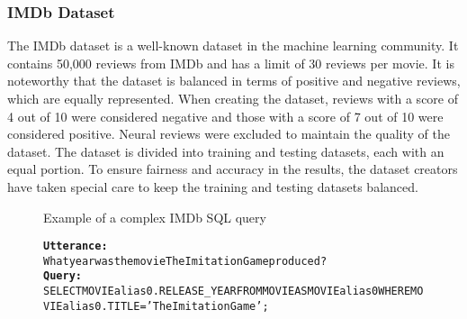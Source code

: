 \subsubsection{IMDb Dataset}

The IMDb dataset is a well-known dataset in the machine learning community. It contains 50,000 reviews from IMDb and has a limit of 30 reviews per movie\cite{maas-EtAl:2011:ACL-HLT2011}. It is noteworthy that the dataset is balanced in terms of positive and negative reviews, which are equally represented. When creating the dataset, reviews with a score of 4 out of 10 were considered negative and those with a score of 7 out of 10 were considered positive. Neural reviews were excluded to maintain the quality of the dataset. The dataset is divided into training and testing datasets, each with an equal portion. To ensure fairness and accuracy in the results, the dataset creators have taken special care to keep the training and testing datasets balanced.


\begin{figure}[H]
    \label{tab:IMDBsqlquery}
    \begin{AIbox}{Example of a complex IMDb SQL query}
        \vspace{-5px}
        \parbox{1\textwidth}{\scriptsize
        \begin{alltt} 
            {\bf Utterance:} \\ 
            What year was the movie The Imitation Game produced?
            \\
            {\bf Query:} \\
            SELECT MOVIEalias0.RELEASE\_YEAR FROM MOVIE AS MOVIEalias0 WHERE MOVIEalias0.TITLE = 'The Imitation Game' ;
        \end{alltt}
        }
        \vspace{-5px}
    \end{AIbox}
\end{figure}

